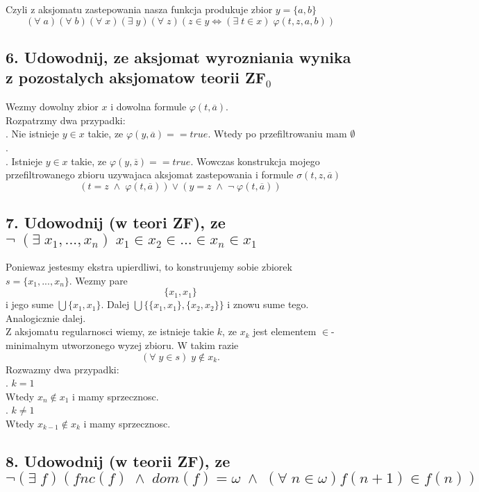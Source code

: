 \documentclass{article}
\begin{document}
Czyli z aksjomatu zastepowania nasza funkcja produkuje zbior $y=\{a, b\}$
$$(\forall\;a)(\forall\;b)(\forall\;x)(\exists\;y)(\forall\;z)(z\in y\iff (\exists\;t\in x)\;\varphi(t,z, a, b))$$

\subsection*{6. Udowodnij, ze aksjomat wyrozniania wynika z pozostalych aksjomatow teorii ZF$_0$}

Wezmy dowolny zbior $x$ i dowolna formule $\varphi(t, \overline a)$.\bigskip\\

Rozpatrzmy dwa przypadki:\medskip\\
. Nie istnieje $y\in x$ takie, ze $\varphi(y, \overline a) == true$. Wtedy po przefiltrowaniu mam $\emptyset$.\medskip\\
. Istnieje $y\in x$ takie, ze $\varphi(y,\overline z) == true$. Wowczas konstrukcja mojego przefiltrowanego zbioru uzywajaca aksjomat zastepowania i formule $\sigma(t, z, \overline a)$
$$(t= z\;\land\; \varphi(t, \overline a))\lor(y= z\;\land\; \neg\;\varphi(t, \overline a))$$

\subsection*{7. Udowodnij (w teori ZF), ze $\neg\;(\exists\;x_1, ..., x_n)\;x_1\in x_2\in...\in x_n\in x_1$}

Poniewaz jestesmy ekstra upierdliwi, to konstruujemy sobie zbiorek $s=\{x_1, ..., x_n\}$. Wezmy pare
$$\{x_1, x_1\}$$
i jego sume $\bigcup \{x_1, x_1\}$. Dalej $\bigcup\{\{x_1, x_1\}, \{x_2, x_2\}\}$ i znowu sume tego. Analogicznie dalej.\bigskip\\

Z aksjomatu regularnosci wiemy, ze istnieje takie $k$, ze $x_k$ jest elementem $\in$-minimalnym utworzonego wyzej zbioru. W takim razie
$$(\forall\;y\in s)\;y\notin x_k.$$
Rozwazmy dwa przypadki:\medskip\\
. $k=1$\smallskip\\
Wtedy $x_n\notin x_1$ i mamy sprzecznosc. \medskip\\
. $k\neq 1$\smallskip\\
Wtedy $x_{k-1}\notin x_k$ i mamy sprzecznosc.

\subsection*{8. Udowodnij (w teorii ZF), ze \\$\neg(\exists\;f)(fnc(f)\;\land\;dom(f)=\omega\;\land\;(\forall\;n\in\omega) f(n+1)\in f(n))$}
\end{document}
